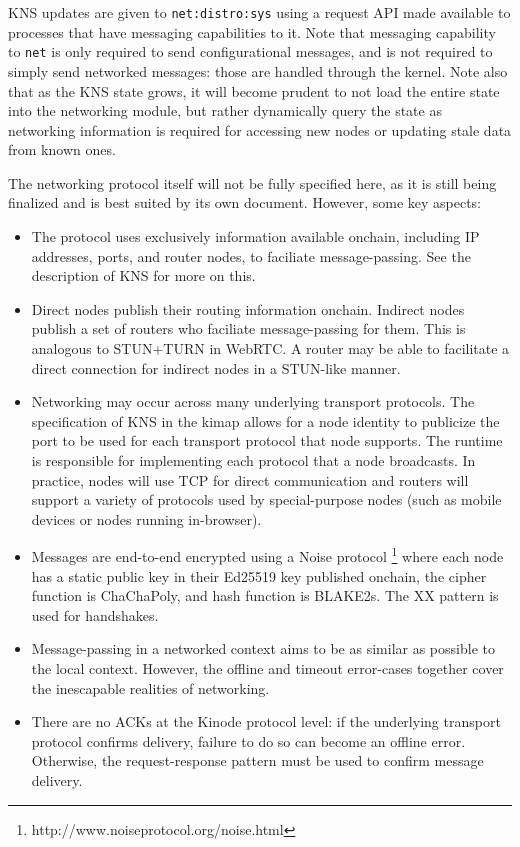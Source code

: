 \documentclass[runningheads]{llncs}
\begin{document}
KNS updates are given to \verb|net:distro:sys| using a request API made available to processes that have messaging capabilities to it.
Note that messaging capability to \verb|net| is only required to send configurational messages, and is not required to simply send networked messages: those are handled through the kernel.
Note also that as the KNS state grows, it will become prudent to not load the entire state into the networking module, but rather dynamically query the state as networking information is required for accessing new nodes or updating stale data from known ones.

The networking protocol itself will not be fully specified here, as it is still being finalized and is best suited by its own document. However, some key aspects:

\begin{itemize}
    \item The protocol uses exclusively information available onchain, including IP addresses, ports, and router nodes, to faciliate message-passing.
    See the description of KNS for more on this.
    \item Direct nodes publish their routing information onchain.
    Indirect nodes publish a set of routers who faciliate message-passing for them.
    This is analogous to STUN+TURN in WebRTC.
    A router may be able to facilitate a direct connection for indirect nodes in a STUN-like manner.
    \item Networking may occur across many underlying transport protocols.
    The specification of KNS in the kimap allows for a node identity to publicize the port to be used for each transport protocol that node supports.
    The runtime is responsible for implementing each protocol that a node broadcasts.
    In practice, nodes will use TCP for direct communication and routers will support a variety of protocols used by special-purpose nodes (such as mobile devices or nodes running in-browser).
    \item Messages are end-to-end encrypted using a Noise protocol
    \footnote{http://www.noiseprotocol.org/noise.html}
    where each node has a static public key in their Ed25519 key published onchain, the cipher function is ChaChaPoly, and hash function is BLAKE2s.
    The XX pattern is used for handshakes.
    \item Message-passing in a networked context aims to be as similar as possible to the local context.
    However, the offline and timeout error-cases together cover the inescapable realities of networking.
    \item There are no ACKs at the Kinode protocol level: if the underlying transport protocol confirms delivery, failure to do so can become an offline error.
    Otherwise, the request-response pattern must be used to confirm message delivery.
\end{itemize}
\end{document}
